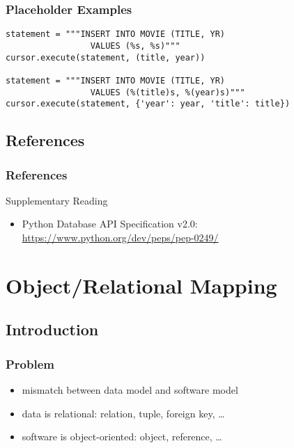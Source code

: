 \documentclass[dvipsnames]{beamer}
\theoremstyle{plain}
\begin{document}
\begin{frame}[fragile]
  \frametitle{Placeholder Examples}

  \begin{lstlisting}
statement = """INSERT INTO MOVIE (TITLE, YR)
                 VALUES (%s, %s)"""
cursor.execute(statement, (title, year))

statement = """INSERT INTO MOVIE (TITLE, YR)
                 VALUES (%(title)s, %(year)s)"""
cursor.execute(statement, {'year': year, 'title': title})
  \end{lstlisting}
\end{frame}

\subsection*{References}

\begin{frame}
  \frametitle{References}

  \begin{block}{Supplementary Reading}
    \begin{itemize}
    \item Python Database API Specification v2.0:\\
      \url{https://www.python.org/dev/peps/pep-0249/}
    \end{itemize}
  \end{block}
\end{frame}

\section{Object/Relational Mapping}

\subsection{Introduction}

\begin{frame}
  \frametitle{Problem}

  \begin{itemize}
    \item mismatch between data model and software model

    \medskip
    \item data is relational: relation, tuple, foreign key, \ldots
    \item software is object-oriented: object, reference, \ldots
  \end{itemize}
\end{frame}
\end{document}
